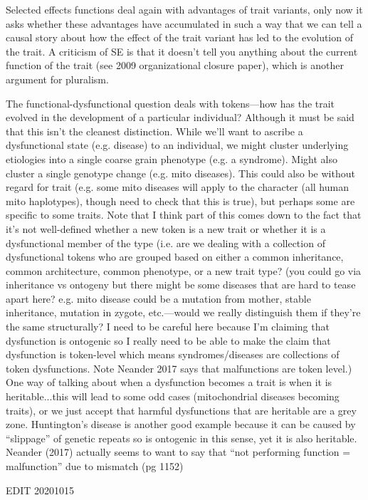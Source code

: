 \documentclass{article}
\begin{document}
Selected effects functions deal again with advantages of trait variants, only now it asks whether these advantages have accumulated in such a way that we can tell a causal story about how the effect of the trait variant has led to the evolution of the trait. A criticism of SE is that it doesn't tell you anything about the current function of the trait (see 2009 organizational closure paper), which is another argument for pluralism.

The functional-dysfunctional question deals with tokens---how has the trait evolved in the development of a particular individual? Although it must be said that this isn't the cleanest distinction. While we'll want to ascribe a dysfunctional state (e.g. disease) to an individual, we might cluster underlying etiologies into a single coarse grain phenotype (e.g. a syndrome). Might also cluster a single genotype change (e.g. mito diseases). This could also be without regard for trait (e.g. some mito diseases will apply to the character (all human mito haplotypes), though need to check that this is true), but perhaps some are specific to some traits.
Note that I think part of this comes down to the fact that it's not well-defined whether a new token is a new trait or whether it is a dysfunctional member of the type (i.e. are we dealing with a collection of dysfunctional tokens who are grouped based on either a common inheritance, common architecture, common phenotype, or a new trait type? (you could go via inheritance vs ontogeny but there might be some diseases that are hard to tease apart here? e.g. mito disease could be a mutation from mother, stable inheritance, mutation in zygote, etc.---would we really distinguish them if they're the same structurally? I need to be careful here because I'm claiming that dysfunction is ontogenic so I really need to be able to make the claim that dysfunction is token-level which means syndromes/diseases are collections of token dysfunctions. Note Neander 2017 says that malfunctions are token level.)
One way of talking about when a dysfunction becomes a trait is when it is heritable...this will lead to some odd cases (mitochondrial diseases becoming traits), or we just accept that harmful dysfunctions that are heritable are a grey zone. Huntington's disease is another good example because it can be caused by ``slippage'' of genetic repeats so is ontogenic in this sense, yet it is also heritable.
Neander (2017) actually seems to want to say that ``not performing function = malfunction'' due to mismatch (pg 1152)

EDIT 20201015
\end{document}

